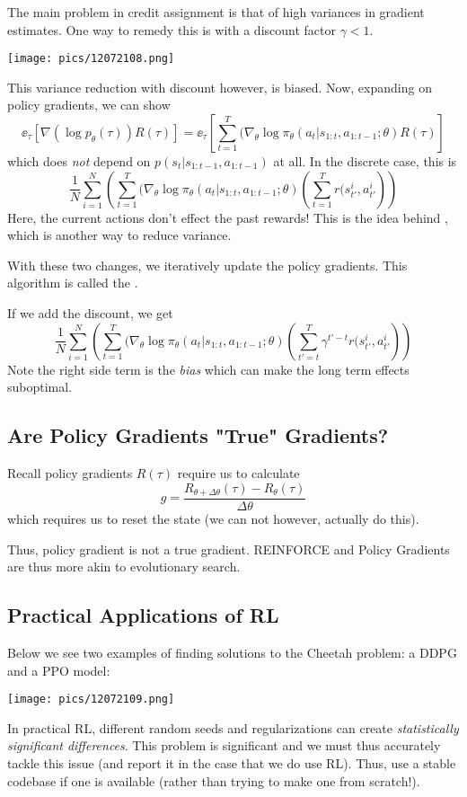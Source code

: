 \documentclass[11pt]{scrartcl}
\begin{document}
The main problem in credit assignment is that of high variances in gradient estimates. One way to remedy this is with a discount factor $\gamma<1$. 
\begin{center}
    \texttt{[image: pics/12072108.png]}
\end{center}
This variance reduction with discount however, is biased. Now, expanding on policy gradients, we can show $$\ee_\tau[\nabla(\log p_\theta(\tau))R(\tau)]=\ee_\tau\left[\sum_{t=1}^{T}(\nabla_\theta \log\pi_\theta(a_t|s_{1:t},a_{1:t-1};\theta)R(\tau)\right]$$ which does \textit{not} depend on $p(s_t|s_{1:t-1},a_{1:t-1})$ at all. In the discrete case, this is $$\frac{1}{N}\sum_{i=1}^{N}\left(\sum_{t=1}^{T}(\nabla_\theta \log\pi_\theta(a_t|s_{1:t},a_{1:t-1};\theta)\left(\sum_{t=1}^{T}r(s^{i}_{t'},a^{i}_{t'}\right)\right)$$
Here, the current actions don't effect the past rewards! This is the idea behind , which is another way to reduce variance.

With these two changes, we iteratively update the policy gradients. This algorithm is called the .

If we add the discount, we get $$\frac{1}{N}\sum_{i=1}^{N}\left(\sum_{t=1}^{T}(\nabla_\theta \log\pi_\theta(a_t|s_{1:t},a_{1:t-1};\theta)\left(\sum_{t'=t}^{T}\gamma^{t'-t}r(s^{i}_{t'},a^{i}_{t'}\right)\right)$$
Note the right side term is the \textit{bias} which can make the long term effects suboptimal. 

\subsection{Are Policy Gradients "True" Gradients?}
Recall policy gradients $R(\tau)$ require us to calculate $$g=\frac{R_{\theta+\Delta\theta}(\tau)-R_\theta(\tau)}{\Delta\theta}$$
which requires us to reset the state (we can not however, actually do this).

Thus, policy gradient is not a true gradient. REINFORCE and Policy Gradients are thus more akin to evolutionary search. 

\subsection{Practical Applications of RL}

Below we see two examples of finding solutions to the Cheetah problem: a DDPG and a PPO model: 
\begin{center}
    \texttt{[image: pics/12072109.png]}
\end{center}
In practical RL, different random seeds and regularizations can create \textit{statistically significant differences}. This problem is significant and we must thus accurately tackle this issue (and report it in the case that we do use RL). Thus, use a stable codebase if one is available (rather than trying to make one from scratch!).
\end{document}
